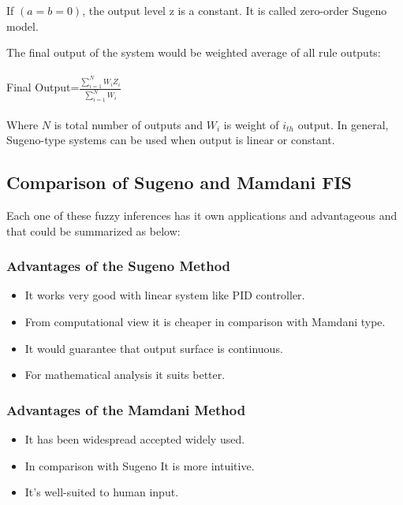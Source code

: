 \documentclass{article}
\begin{document}
If $(a=b =0)$, the output level z is a constant. It is called zero-order Sugeno model.

The final output of the system would be weighted average of all rule outputs:
\\
\\
Final Output=$\frac{ \sum_{i=1}^{N} W_{i}Z_{i}  }{ \sum_{i=1}^{N} W_{i} } $
\\
\\
Where $N$ is total number of outputs and $W_{i}$ is weight of $i_{th}$ output.
In general, Sugeno-type systems can be used when output is linear or constant. 
 

\subsection{Comparison of Sugeno and Mamdani FIS}
Each one of these fuzzy inferences has it own applications and advantageous and that could be summarized as below\citep{Fuzzy_Logic_Toolbox_For_Use_with_MATLAB}:
\subsubsection{Advantages of the Sugeno Method}
\begin{itemize}
\item It works very good with linear system like PID controller.
\item From computational view it is cheaper in comparison with Mamdani type.
\item It would guarantee that output surface is continuous.
\item For mathematical analysis it suits better.
\end{itemize}

\subsubsection{Advantages of the Mamdani Method}
\begin{itemize}
\item It has been widespread accepted widely used.
\item In comparison with Sugeno It is more intuitive.
\item It's well-suited to human input.
\end{itemize}
\end{document}
